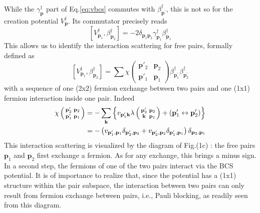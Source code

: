 \documentclass[aps,prb,superscriptaddress,twocolumn]{revtex4}
\newcommand{\vk}{\ensuremath{\mathbf{k}}}
\newcommand{\vp}{\ensuremath{\mathbf{p}}}
\begin{document}
While the $\gamma^{\dagger}_\vp$ part of Eq.\eqref{eq:vbcs} 
commutes with $%
\beta^{\dagger}_{\vp ^\prime}$, 
this is not so for the creation potential $%
V^{\dagger}_\vp$. Its commutator precisely reads 
\begin{equation}  \label{eq:vpotbeta}
\left[V^{\dagger}_{\mathbf{p} _1},\beta^{\dagger}_{\mathbf{p} _2}\right] 
=-2\delta_{\mathbf{p} _1\mathbf{p} _2}\gamma^{\dagger}_{\mathbf{p}
_1}\beta^{\dagger}_{\mathbf{p} _1}
\end{equation}
This allows us to identify the interaction scattering for free pairs,
formally defined as 
\begin{equation}  \label{eq:vBeta}
\left[V^{\dagger}_{\mathbf{p} _1},\beta^{\dagger}_{\mathbf{p} _2}\right] 
=\sum\chi\left(\begin{smallmatrix}\vp'_2&\vp_2\\\vp'_1&\vp_1\end{smallmatrix}%
\right)  \beta^{\dagger}_{\mathbf{p} ^{\prime}_1}\beta^{\dagger}_{\mathbf{p}
^{\prime}_2}
\end{equation}
with a sequence of one (2x2) fermion exchange between two pairs and one (1x1) fermion interaction inside one pair. Indeed 
\begin{equation}  \label{eq:interactSc}
\begin{split}
\chi\left(\begin{smallmatrix}\vp'_2&\vp_2\\\vp'_1&\vp_1\end{smallmatrix}%
\right)  &=-\sum_\vk\left\{v_{\mathbf{p} ^{\prime}_1\mathbf{k} }\lambda\left(%
\begin{smallmatrix}\vp'_2&\vp_2\\\vk&\vp_1\end{smallmatrix}\right)  +\left(%
\mathbf{p} ^{\prime}_1\leftrightarrow\mathbf{p} ^{\prime}_2\right) \right\} 
\\
&=-\left(v_{\mathbf{p} ^{\prime}_1,\mathbf{p} _1}\delta_{\mathbf{p}
^{\prime}_2,\mathbf{p} _2}+v_{\mathbf{p} ^{\prime}_2,\mathbf{p} _2}\delta_{%
\mathbf{p} ^{\prime}_1,\mathbf{p} _1}\right) \delta_{\mathbf{p} _2,\mathbf{p}
_1}
\end{split}%
\end{equation}
This interaction scattering is visualized by the diagram of Fig.(1c) 
: the free pairs $\mathbf{p}_1$ and $\mathbf{p}_2$ first
exchange a fermion. As for any exchange, this brings a minus sign. In a
second step, the fermions of one of the two pairs interact via the BCS
potential. It is of importance to realize that, since the potential has a (1x1)
structure within the pair subspace, the interaction between two pairs can only result from
fermion exchange between pairs, i.e., Pauli blocking, as readily seen from this diagram.
\end{document}
